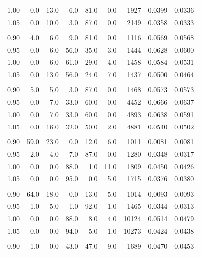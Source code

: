 \begin{table}[t]
\begin{tabular}{r r r r r r r r r}
1.00 & 0.0 & 13.0 & 6.0 & 81.0 & 0.0 & 1927 & 0.0399 & 0.0336 \\
1.05 & 0.0 & 10.0 & 3.0 & 87.0 & 0.0 & 2149 & 0.0358 & 0.0333 \\
\addlinespace[0.35em]
\multicolumn{9}{l}{$N=8$, $\mathrm{ppn}=4$, $t=1\,\mathrm{s}$} \\
\midrule
0.90 & 4.0 & 6.0 & 9.0 & 81.0 & 0.0 & 1116 & 0.0569 & 0.0568 \\
0.95 & 0.0 & 6.0 & 56.0 & 35.0 & 3.0 & 1444 & 0.0628 & 0.0600 \\
1.00 & 0.0 & 6.0 & 61.0 & 29.0 & 4.0 & 1458 & 0.0584 & 0.0531 \\
1.05 & 0.0 & 13.0 & 56.0 & 24.0 & 7.0 & 1437 & 0.0500 & 0.0464 \\
\addlinespace[0.35em]
\multicolumn{9}{l}{$N=8$, $\mathrm{ppn}=4$, $t=10\,\mathrm{s}$} \\
\midrule
0.90 & 5.0 & 5.0 & 3.0 & 87.0 & 0.0 & 1468 & 0.0573 & 0.0573 \\
0.95 & 0.0 & 7.0 & 33.0 & 60.0 & 0.0 & 4452 & 0.0666 & 0.0637 \\
1.00 & 0.0 & 7.0 & 33.0 & 60.0 & 0.0 & 4893 & 0.0638 & 0.0591 \\
1.05 & 0.0 & 16.0 & 32.0 & 50.0 & 2.0 & 4881 & 0.0540 & 0.0502 \\
\addlinespace[0.35em]
\multicolumn{9}{l}{$N=8$, $\mathrm{ppn}=8$, $t=1\,\mathrm{s}$} \\
\midrule
0.90 & 59.0 & 23.0 & 0.0 & 12.0 & 6.0 & 1011 & 0.0081 & 0.0081 \\
0.95 & 2.0 & 4.0 & 7.0 & 87.0 & 0.0 & 1280 & 0.0348 & 0.0317 \\
1.00 & 0.0 & 0.0 & 88.0 & 1.0 & 11.0 & 1809 & 0.0450 & 0.0426 \\
1.05 & 0.0 & 0.0 & 95.0 & 0.0 & 5.0 & 1715 & 0.0376 & 0.0380 \\
\addlinespace[0.35em]
\multicolumn{9}{l}{$N=8$, $\mathrm{ppn}=8$, $t=10\,\mathrm{s}$} \\
\midrule
0.90 & 64.0 & 18.0 & 0.0 & 13.0 & 5.0 & 1014 & 0.0093 & 0.0093 \\
0.95 & 1.0 & 5.0 & 1.0 & 92.0 & 1.0 & 1465 & 0.0344 & 0.0313 \\
1.00 & 0.0 & 0.0 & 88.0 & 8.0 & 4.0 & 10124 & 0.0514 & 0.0479 \\
1.05 & 0.0 & 0.0 & 94.0 & 5.0 & 1.0 & 10273 & 0.0424 & 0.0438 \\
\addlinespace[0.35em]
\multicolumn{9}{l}{$N=16$, $\mathrm{ppn}=4$, $t=1\,\mathrm{s}$} \\
\midrule
0.90 & 1.0 & 0.0 & 43.0 & 47.0 & 9.0 & 1689 & 0.0470 & 0.0453 \\

\end{tabular}
\end{table}
